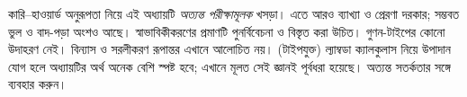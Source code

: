 \documentclass[../../../include/open-logic-chapter]{subfiles}
\begin{document}

\begin{editorial}
  কারি--হাওয়ার্ড অনুরূপতা নিয়ে এই অধ্যায়টি
  \emph{অত্যন্ত পরীক্ষামূলক} খসড়া।
  এতে আরও ব্যাখ্যা ও প্রেরণা দরকার;
  সম্ভবত ভুল ও বাদ-পড়া অংশও আছে।
  স্বাভাবিকীকরণের প্রমাণটি পুনর্বিবেচনা
  ও বিস্তৃত করা উচিত। গুণন-টাইপের
  কোনো উদাহরণ নেই। বিন্যাস ও
  সরলীকরণ রূপান্তর এখানে আলোচিত নয়।
  (টাইপযুক্ত) ল্যাম্বডা ক্যালকুলাস নিয়ে
  উপাদান যোগ হলে অধ্যায়টির অর্থ
  অনেক বেশি স্পষ্ট হবে; এখানে মূলত
  সেই জ্ঞানই পূর্বধরা হয়েছে।
  অত্যন্ত সতর্কতার সঙ্গে ব্যবহার করুন।
\end{editorial}


\OLEndChapterHook
\end{document}
